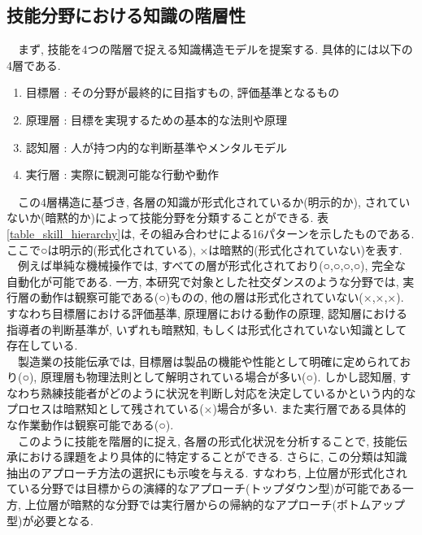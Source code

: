 \subsection{技能分野における知識の階層性}
　まず, 技能を4つの階層で捉える知識構造モデルを提案する. 具体的には以下の4層である.
\begin{enumerate}
\item 目標層 : その分野が最終的に目指すもの, 評価基準となるもの
\item 原理層 : 目標を実現するための基本的な法則や原理
\item 認知層 : 人が持つ内的な判断基準やメンタルモデル
\item 実行層 : 実際に観測可能な行動や動作
\end{enumerate}
　この4層構造に基づき, 各層の知識が形式化されているか(明示的か), されていないか(暗黙的か)によって技能分野を分類することができる. 表\ref{table_skill_hierarchy}は, その組み合わせによる16パターンを示したものである. ここで○は明示的(形式化されている), ×は暗黙的(形式化されていない)を表す.\\
　例えば単純な機械操作では, すべての層が形式化されており(○,○,○,○), 完全な自動化が可能である. 一方, 本研究で対象とした社交ダンスのような分野では, 実行層の動作は観察可能である(○)ものの, 他の層は形式化されていない(×,×,×). すなわち目標層における評価基準, 原理層における動作の原理, 認知層における指導者の判断基準が, いずれも暗黙知, もしくは形式化されていない知識として存在している.\\
　製造業の技能伝承では, 目標層は製品の機能や性能として明確に定められており(○), 原理層も物理法則として解明されている場合が多い(○). しかし認知層, すなわち熟練技能者がどのように状況を判断し対応を決定しているかという内的なプロセスは暗黙知として残されている(×)場合が多い. また実行層である具体的な作業動作は観察可能である(○).\\
　このように技能を階層的に捉え, 各層の形式化状況を分析することで, 技能伝承における課題をより具体的に特定することができる. さらに, この分類は知識抽出のアプローチ方法の選択にも示唆を与える. すなわち, 上位層が形式化されている分野では目標からの演繹的なアプローチ(トップダウン型)が可能である一方, 上位層が暗黙的な分野では実行層からの帰納的なアプローチ(ボトムアップ型)が必要となる.\\


